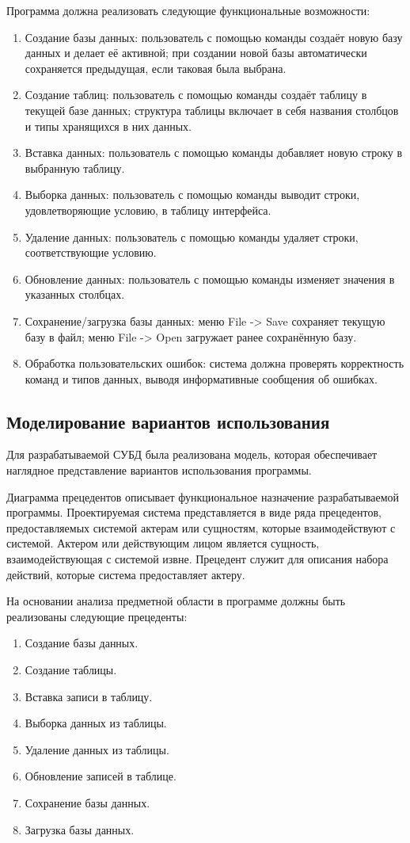 Программа должна реализовать следующие функциональные возможности:
\begin{enumerate}
	\item Создание базы данных: пользователь с помощью команды создаёт новую базу данных и делает её активной; при создании новой базы автоматически сохраняется предыдущая, если таковая была выбрана.
	\item Создание таблиц: пользователь с помощью команды создаёт таблицу в текущей базе данных; структура таблицы включает в себя названия столбцов и типы хранящихся в них данных.
	\item Вставка данных: пользователь с помощью команды добавляет новую строку в выбранную таблицу.
	\item Выборка данных: пользователь с помощью команды выводит строки, удовлетворяющие условию, в таблицу интерфейса.
	\item Удаление данных: пользователь с помощью команды удаляет строки, соответствующие условию.
	\item Обновление данных: пользователь с помощью команды изменяет значения в указанных столбцах.
	\item Сохранение/загрузка базы данных: меню File -> Save сохраняет текущую базу в файл; меню File -> Open загружает ранее сохранённую базу.
	\item Обработка пользовательских ошибок: система должна проверять корректность команд и типов данных, выводя информативные сообщения об ошибках.
\end{enumerate}

\subsection{Моделирование вариантов использования}

Для разрабатываемой СУБД была реализована модель, которая обеспечивает наглядное представление вариантов использования программы.

Диаграмма прецедентов описывает функциональное назначение разрабатываемой программы. Проектируемая система представляется в виде ряда прецедентов, предоставляемых системой актерам или сущностям, которые взаимодействуют с системой. Актером или действующим лицом является сущность, взаимодействующая с системой извне. Прецедент служит для описания набора действий, которые система предоставляет актеру.

На основании анализа предметной области в программе должны быть реализованы следующие прецеденты:
\begin{enumerate}
	\item Создание базы данных.
	\item Создание таблицы.
	\item Вставка записи в таблицу.
	\item Выборка данных из таблицы.
	\item Удаление данных из таблицы.
	\item Обновление записей в таблице.
	\item Сохранение базы данных.
	\item Загрузка базы данных.
\end{enumerate}

